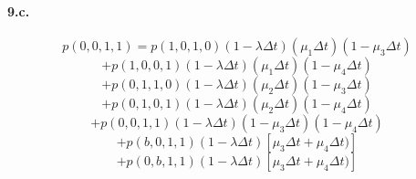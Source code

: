 \documentclass{article}
\begin{document}
   \paragraph{9.c.}
      $$p(0,0,1,1) = p(1,0,1,0) (1 - \lambda \Delta t) (\mu_1 \Delta t) (1 - \mu_3 \Delta t)$$
      $$           + p(1,0,0,1) (1 - \lambda \Delta t) (\mu_1 \Delta t) (1 - \mu_4 \Delta t)$$
      $$           + p(0,1,1,0) (1 - \lambda \Delta t) (\mu_2 \Delta t) (1 - \mu_3 \Delta t)$$
      $$           + p(0,1,0,1) (1 - \lambda \Delta t) (\mu_2 \Delta t) (1 - \mu_4 \Delta t)$$
      $$           + p(0,0,1,1) (1 - \lambda \Delta t) (1 - \mu_3 \Delta t) (1 - \mu_4 \Delta t)$$
      $$           + p(b,0,1,1) (1 - \lambda \Delta t) [\mu_3 \Delta t + \mu_4 \Delta t)]$$
      $$           + p(0,b,1,1) (1 - \lambda \Delta t) [\mu_3 \Delta t + \mu_4 \Delta t)]$$
\end{document}
